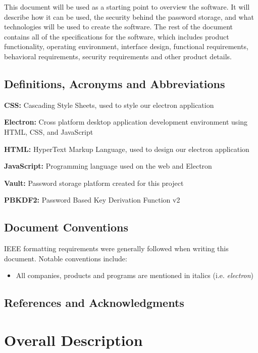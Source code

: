 \documentclass[11pt]{report}
\begin{document}
This document will be used as a starting point to overview the
software. It will describe how it can be used, the security behind the
password storage, and what technologies will be used to create the software.
The rest of the document contains all of the specifications for the
software, which includes product functionality, operating environment,
interface design, functional requirements, behavioral requirements, 
security requirements and other product details.


\section{Definitions, Acronyms and Abbreviations}
\textbf{CSS:} Cascading Style Sheets, used to style our electron application

\textbf{Electron:} Cross platform desktop application development environment
using HTML, CSS, and JavaScript

\textbf{HTML:} HyperText Markup Language, used to design our electron application

\textbf{JavaScript:} Programming language used on the web and Electron

\textbf{Vault:} Password storage platform created for this project

\textbf{PBKDF2:} Password Based Key Derivation Function v2


\section{Document Conventions}
IEEE formatting requirements were generally followed when writing this document.
Notable conventions include:

\begin{itemize}
    \item All companies, products and programs are mentioned in italics (i.e. \textit{electron})
    
\end{itemize}


\section{References and Acknowledgments}

    \nocite{*}
    \printbibliography[heading=none]



\chapter{Overall Description}
\end{document}
